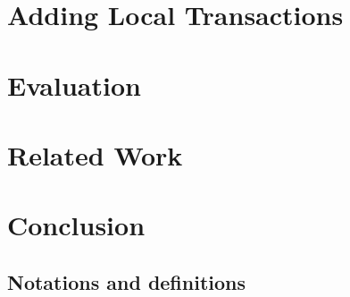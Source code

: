 \documentclass[preprint,10pt]{sigplanconf}
\begin{document}
\section{Adding Local Transactions} \label{sec:alg}


\section{Evaluation} \label{sec:eval}


\section{Related Work} \label{sec:related}


\section{Conclusion} \label{sec:conclusions}












\begin{appendix}
	
	\section{Notations and definitions} \label{sec:app1}


\end{appendix}
\end{document}
